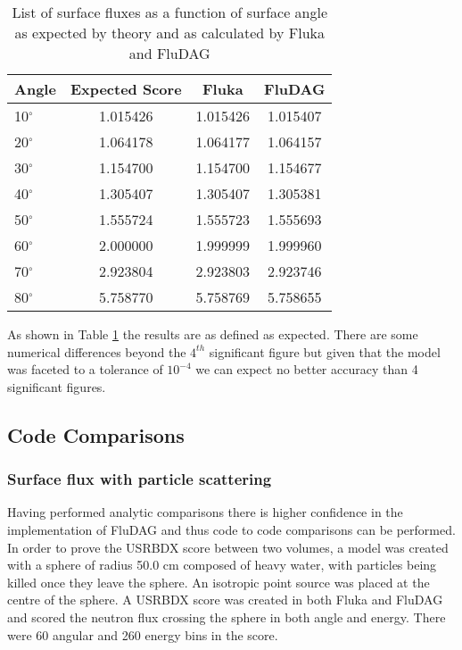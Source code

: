 \documentclass{anstrans}[12pt]
\begin{document}
\begin{table}%
        \begin{center}
                \begin{tabular}{|l|c|c|c|}
                  \hline
                        Angle & Expected Score & Fluka  & FluDAG \\
                        \hline
                        10$^{\circ}$ & 1.015426 & 1.015426 & 1.015407\\
                        20$^{\circ}$ & 1.064178 & 1.064177 & 1.064157\\
                        30$^{\circ}$ & 1.154700 & 1.154700 & 1.154677\\
                        40$^{\circ}$ & 1.305407 & 1.305407 & 1.305381\\
                        50$^{\circ}$ & 1.555724 & 1.555723 & 1.555693\\
                        60$^{\circ}$ & 2.000000 & 1.999999 & 1.999960\\
                        70$^{\circ}$ & 2.923804 & 2.923803 & 2.923746\\
                        80$^{\circ}$ & 5.758770 & 5.758769 & 5.758655\\
                        \hline
                \end{tabular}
                \caption{List of surface fluxes as a function of surface
                         angle as expected by theory and as calculated by 
                         Fluka and FluDAG}
                \label{usrbdx_crossing_a}
                \end{center}
\end{table}

As shown in Table \ref{usrbdx_crossing_a} the results are as defined as expected. 
There are some numerical differences beyond the $4^{th}$ significant figure but given that the model
was faceted to a tolerance of $10^{-4}$ we can expect no better accuracy 
than 4 significant figures.

\subsection{Code Comparisons}
\subsubsection*{Surface flux with particle scattering}
Having performed analytic comparisons there is higher confidence in
the implementation of FluDAG and thus code to code comparisons can be
performed. In order to prove the USRBDX score between two volumes, a
model was created with a sphere of radius 50.0 cm composed of heavy
water, with particles being killed once they leave the sphere. An
isotropic point source was placed at the centre of the sphere. A
USRBDX score was created in both Fluka and FluDAG and scored the
neutron flux crossing the sphere in both angle and energy. There were
60 angular and 260 energy bins in the score.
\end{document}
